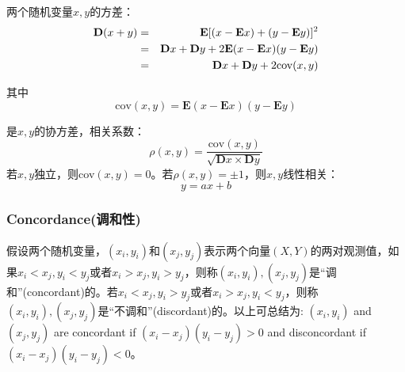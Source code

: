 两个随机变量$x,y$的方差：
\begin{eqnarray}
    \mathbf{D}(x+y) &=& \mathbf{E}[(x-\mathbf{E}x) + (y-\mathbf{E}y)]^2 \notag \\
    &=&\mathbf{D}x+\mathbf{D}y+2\mathbf{E}(x-\mathbf{E}x)(y-\mathbf{E}y) \notag \\
    &=&\mathbf{D}x+\mathbf{D}y+2\text{cov}(x,y)
    \label{eq-cov-var}
\end{eqnarray}

其中
\begin{equation}
    \text{cov}(x,y) = \mathbf{E}(x-\mathbf{E}x) (y-\mathbf{E}y)
    \label{eq-covariation}
\end{equation}

是$x,y$的协方差，相关系数：
\begin{equation}
    \rho (x,y) = \dfrac{\text{cov}(x,y)}{\sqrt{\mathbf{D}x\times\mathbf{D}y}}
    \label{eq-coefficient}
\end{equation}
若$x,y$独立，则cov$(x,y) = 0$。若$\rho(x,y) = \pm 1$，则$x,y$线性相关：
\begin{equation*}
    y = ax+b
\end{equation*}


\subsubsection{Concordance(调和性)}
假设两个随机变量，$(x_i,y_i)$和$(x_j,y_j)$表示两个向量$(X,Y)$的两对观测值，如果$x_i<x_j,y_i<y_j$或者$x_i>x_j,y_i>y_j$，则称$(x_i,y_i),(x_j,y_j)$是``调和''(concordant)的。若$x_i<x_j,y_i>y_j$或者$x_i>x_j,y_i<y_j$，则称$(x_i,y_i),(x_j,y_j)$是``不调和''(discordant)的。以上可总结为:
$(x_i,y_i)$ and $(x_j,y_j)$ are concordant if $(x_i-x_j)(y_i-y_j)>0$ and disconcordant if $(x_i-x_j)(y_i-y_j)<0$。

